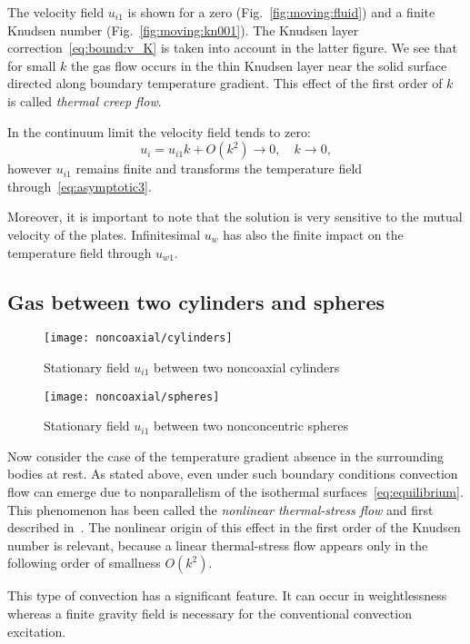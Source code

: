 \documentclass[english,a4paper,10pt]{article}
\begin{document}
The velocity field \(u_{i1}\) is shown for a zero (Fig.~\ref{fig:moving:fluid})
and a finite Knudsen number (Fig.~\ref{fig:moving:kn001}).
The Knudsen layer correction~\eqref{eq:bound:v_K} is taken into account in the latter figure.
We see that for small \(k\) the gas flow occurs in the thin Knudsen layer near the solid surface
directed along boundary temperature gradient.
This effect of the first order of \(k\) is called \textit{thermal creep flow}.

In the continuum limit the velocity field tends to zero:
\[ u_i = u_{i1}k + O(k^2) \to 0, \quad k\to0, \]
however \(u_{i1}\) remains finite and transforms the temperature field through~\eqref{eq:asymptotic3}.

Moreover, it is important to note that the solution is very sensitive to the mutual velocity of the plates.
Infinitesimal \(u_w\) has also the finite impact on the temperature field through \(u_{w1}\).

\subsection{Gas between two cylinders and spheres}

\begin{figure}[ht]
	\centering
	\texttt{[image: noncoaxial/cylinders]}
	\caption{Stationary field \(u_{i1}\) between two noncoaxial cylinders}\label{fig:cylinders}
\end{figure}

\begin{figure}
	\centering
	\texttt{[image: noncoaxial/spheres]}
	\caption{Stationary field \(u_{i1}\) between two nonconcentric spheres}\label{fig:spheres}
\end{figure}

Now consider the case of the temperature gradient absence in the surrounding bodies at rest.
As stated above, even under such boundary conditions convection flow can emerge
due to nonparallelism of the isothermal surfaces~\eqref{eq:equilibrium}.
This phenomenon has been called the \textit{nonlinear thermal-stress flow} and first described in~\cite{Kogan1971}.
The nonlinear origin of this effect in the first order of the Knudsen number is relevant,
because a linear thermal-stress flow appears only in the following order of smallness \(O(k^2)\).

This type of convection has a significant feature. It can occur in weightlessness
whereas a finite gravity field is necessary for the conventional convection excitation.
\end{document}

